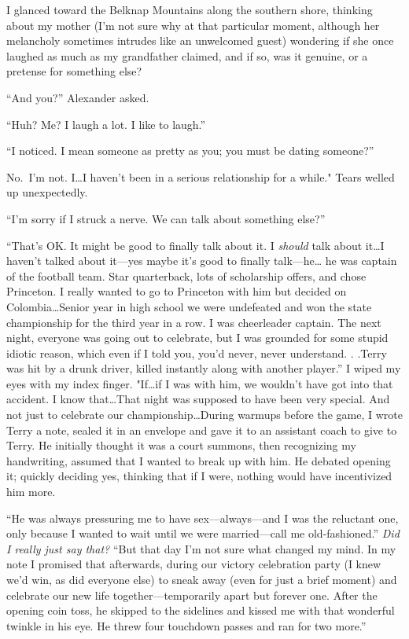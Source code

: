 I glanced toward the Belknap Mountains along the southern shore,
thinking about my mother (I'm not sure why at that particular moment,
although her melancholy sometimes intrudes like an unwelcomed guest)
wondering if she once laughed as much as my grandfather claimed, and if
so, was it genuine, or a pretense for something else?

``And you?'' Alexander asked.

``Huh? Me? I laugh a lot. I like to laugh.''

``I noticed. I mean someone as pretty as you; you must be dating
someone?''

No.~I'm not. I\ldots I haven't been in a serious relationship for a
while." Tears welled up unexpectedly.

``I'm sorry if I struck a nerve. We can talk about something else?''

``That's OK. It might be good to finally talk about it. I \emph{should}
talk about it\ldots I haven't talked about it---yes maybe it's good to
finally talk---he\ldots{} he was captain of the football team. Star
quarterback, lots of scholarship offers, and chose Princeton. I really
wanted to go to Princeton with him but decided on Colombia\ldots Senior
year in high school we were undefeated and won the state championship
for the third year in a row. I was cheerleader captain. The next night,
everyone was going out to celebrate, but I was grounded for some stupid
idiotic reason, which even if I told you, you'd never, never understand.
. .Terry was hit by a drunk driver, killed instantly along with another
player.'' I wiped my eyes with my index finger. "If\ldots if I was with
him, we wouldn't have got into that accident. I know that\ldots That
night was supposed to have been very special. And not just to celebrate
our championship\ldots During warmups before the game, I wrote Terry a
note, sealed it in an envelope and gave it to an assistant coach to give
to Terry. He initially thought it was a court summons, then recognizing
my handwriting, assumed that I wanted to break up with him. He debated
opening it; quickly deciding yes, thinking that if I were, nothing would
have incentivized him more.

``He was always pressuring me to have sex---always---and I was the
reluctant one, only because I wanted to wait until we were
married---call me old-fashioned.'' \emph{Did I really just say that?}
``But that day I'm not sure what changed my mind. In my note I promised
that afterwards, during our victory celebration party (I knew we'd win,
as did everyone else) to sneak away (even for just a brief moment) and
celebrate our new life together---temporarily apart but forever one.
After the opening coin toss, he skipped to the sidelines and kissed me
with that wonderful twinkle in his eye. He threw four touchdown passes
and ran for two more.''

